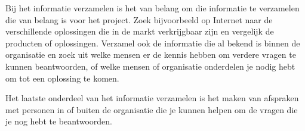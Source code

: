 Bij het informatie verzamelen is het van belang om die informatie te verzamelen die van belang is voor het project. Zoek bijvoorbeeld op Internet naar de verschillende oplossingen die in de markt verkrijgbaar zijn en vergelijk de producten of oplossingen. Verzamel ook de informatie die al bekend is binnen de organisatie en zoek uit welke mensen er de kennis hebben om verdere vragen te kunnen beantwoorden, of welke mensen of organisatie onderdelen je nodig hebt om tot een oplossing te komen.

Het laatste onderdeel van het informatie verzamelen is het maken van afspraken met personen in of buiten de organisatie die je kunnen helpen om de vragen die je nog hebt te beantwoorden.
